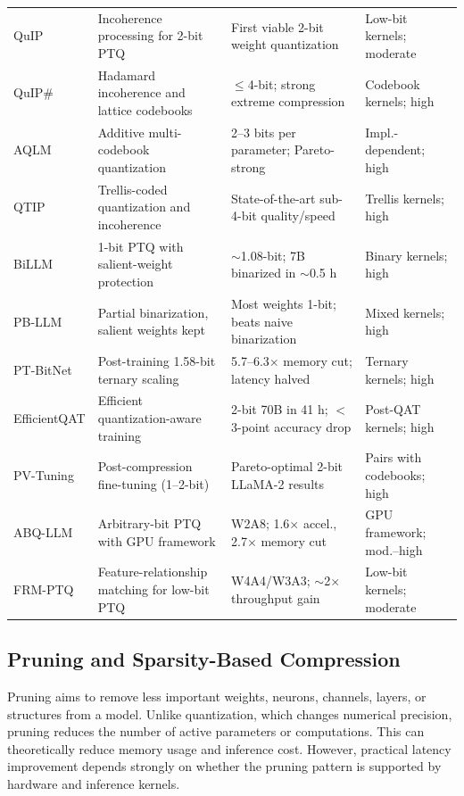 \begin{table}[htbp]
\begin{tabular}{p{}p{}p{}p{}}
QuIP \cite{chee2023quip} & Incoherence processing for 2-bit PTQ & First viable 2-bit weight quantization & Low-bit kernels; moderate \\
QuIP\# \cite{tseng2024quipsharp} & Hadamard incoherence and lattice codebooks & $\leq$4-bit; strong extreme compression & Codebook kernels; high \\
AQLM \cite{egiazarian2024aqlm} & Additive multi-codebook quantization & 2--3 bits per parameter; Pareto-strong & Impl.-dependent; high \\
QTIP \cite{tseng2024qtip} & Trellis-coded quantization and incoherence & State-of-the-art sub-4-bit quality/speed & Trellis kernels; high \\
BiLLM \cite{huang2024billm} & 1-bit PTQ with salient-weight protection & $\sim$1.08-bit; 7B binarized in $\sim$0.5 h & Binary kernels; high \\
PB-LLM \cite{shang2023pbllm} & Partial binarization, salient weights kept & Most weights 1-bit; beats naive binarization & Mixed kernels; high \\
PT-BitNet \cite{survey2025ptbitnet} & Post-training 1.58-bit ternary scaling & 5.7--6.3$\times$ memory cut; latency halved & Ternary kernels; high \\
EfficientQAT \cite{chen2025efficientqat} & Efficient quantization-aware training & 2-bit 70B in 41 h; $<$3-point accuracy drop & Post-QAT kernels; high \\
PV-Tuning \cite{malinovskii2024pvtuning} & Post-compression fine-tuning (1--2-bit) & Pareto-optimal 2-bit LLaMA-2 results & Pairs with codebooks; high \\
ABQ-LLM \cite{zeng2025abqllm} & Arbitrary-bit PTQ with GPU framework & W2A8; 1.6$\times$ accel., 2.7$\times$ memory cut & GPU framework; mod.--high \\
FRM-PTQ \cite{survey2026frmptq} & Feature-relationship matching for low-bit PTQ & W4A4/W3A3; $\sim$2$\times$ throughput gain & Low-bit kernels; moderate \\
\hline
\end{tabular}
\end{table}

\subsection{Pruning and Sparsity-Based Compression}

Pruning aims to remove less important weights, neurons, channels, layers, or structures from a model. Unlike quantization, which changes numerical precision, pruning reduces the number of active parameters or computations. This can theoretically reduce memory usage and inference cost. However, practical latency improvement depends strongly on whether the pruning pattern is supported by hardware and inference kernels.

